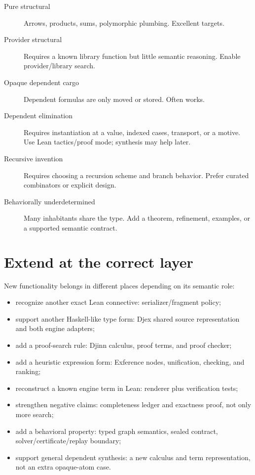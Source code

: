 \documentclass[10pt,letterpaper,oneside,openany]{report}
\newcommand{\term}[1]{\texttt{\detokenize{#1}}}
\begin{document}
\begin{description}
\item[Pure structural] Arrows, products, sums, polymorphic plumbing.  Excellent \term{:synth} targets.
\item[Provider structural] Requires a known library function but little semantic reasoning.  Enable provider/library search.
\item[Opaque dependent cargo] Dependent formulas are only moved or stored.  Often works.
\item[Dependent elimination] Requires instantiation at a value, indexed cases, transport, or a motive.  Use Lean tactics/proof mode; synthesis may help later.
\item[Recursive invention] Requires choosing a recursion scheme and branch behavior.  Prefer curated combinators or explicit design.
\item[Behaviorally underdetermined] Many inhabitants share the type.  Add a theorem, refinement, examples, or a supported semantic contract.
\end{description}

\section{Extend at the correct layer}

New functionality belongs in different places depending on its semantic role:

\begin{itemize}
\item recognize another exact Lean connective: serializer/fragment policy;
\item support another Haskell-like type form: Djex shared source representation and both engine adapters;
\item add a proof-search rule: Djinn calculus, proof terms, and proof checker;
\item add a heuristic expression form: Exference nodes, unification, checking, and ranking;
\item reconstruct a known engine term in Lean: renderer plus verification tests;
\item strengthen negative claims: completeness ledger and exactness proof, not only more search;
\item add a behavioral property: typed graph semantics, sealed contract, solver/certificate/replay boundary;
\item support general dependent synthesis: a new calculus and term representation, not an extra opaque-atom case.
\end{itemize}
\end{document}
